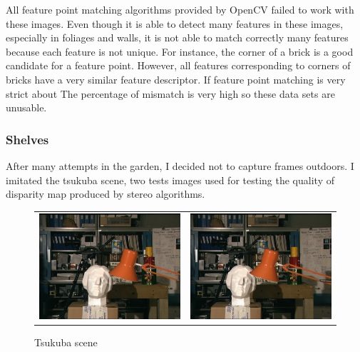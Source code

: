 \documentclass[11pt]{report}
\begin{document}
All feature point matching algorithms provided by OpenCV failed to work with these images. Even though it is able to detect many features in these images, especially in foliages and walls, it is not able to match correctly many features because each feature is not unique. For instance, the corner of a brick is a good candidate for a feature point. However, all features corresponding to corners of bricks have a very similar feature descriptor. If feature point matching is very strict about 
The percentage of mismatch is very high so these data sets are unusable.

\subsubsection{Shelves}

After many attempts in the garden, I decided not to capture frames outdoors. I imitated the tsukuba scene, two tests images used for testing the quality of disparity map produced by stereo algorithms.

\begin{figure}[H]
\begin{tabular}{cc}
\includegraphics[scale=0.45]{images/tsukuba_left.png} &
\includegraphics[scale=0.45]{images/tsukuba_right.png} \\
\end{tabular}
\caption{Tsukuba scene}
\end{figure}
\end{document}
